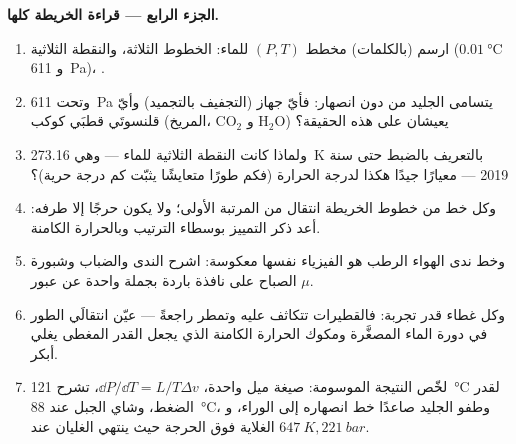 \begin{problem}
\medskip\noindent\textbf{الجزء الرابع --- قراءة الخريطة كلها.}
\begin{enumerate}[resume]
  \item ارسم (بالكلمات) مخطط $(P, T)$ للماء: الخطوط
        الثلاثة، والنقطة الثلاثية ($\qty{0.01}{\celsius}$ و
        \qty{611}{Pa})، .
  \item وتحت \qty{611}{Pa} يتسامى الجليد من دون انصهار: فأيّ
        جهاز (التجفيف بالتجميد) وأيّ قلنسوتَي قطبَي كوكب
        (المريخ، CO$_2$ و H$_2$O) يعيشان على هذه الحقيقة؟
  \item ولماذا كانت النقطة الثلاثية للماء --- وهي
        \qty{273.16}{K} بالتعريف بالضبط حتى سنة 2019 --- معيارًا
        جيدًا هكذا لدرجة الحرارة (فكم طورًا متعايشًا يثبّت كم
        درجة حرية)؟
  \item وكل خط من خطوط الخريطة انتقال من المرتبة الأولى؛ ولا يكون
        حرجًا إلا طرفه: أعد ذكر التمييز بوسطاء
        الترتيب وبالحرارة الكامنة.
  \item وخط ندى الهواء الرطب هو الفيزياء نفسها معكوسة:
        اشرح الندى والضباب وشبورة الصباح على نافذة باردة
        بجملة واحدة عن عبور $\mu$.
  \item وكل غطاء قدر تجربة: فالقطيرات تتكاثف عليه
        وتمطر راجعةً --- عيّن انتقالَي الطور في دورة الماء
        المصغَّرة ومكوك الحرارة الكامنة الذي
        يجعل القدر المغطى يغلي أبكر.
  \item لخّص النتيجة الموسومة: صيغة ميل واحدة، $\dd P/
        \dd T = L/T\Delta v$، تشرح \qty{121}{\celsius} لقدر
        الضغط، وشاي الجبل عند \qty{88}{\celsius}، وطفو الجليد
        صاعدًا خط انصهاره إلى الوراء، و
        الغلاية فوق الحرجة حيث ينتهي الغليان عند
        $\qty{647}{K}, \qty{221}{bar}$.
\end{enumerate}
\end{problem}

